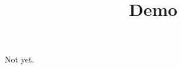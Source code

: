 \documentclass{ximera}
\title{Demo}
\begin{document}
\begin{abstract}
\end{abstract}
\maketitle

Not yet.
\end{document}
